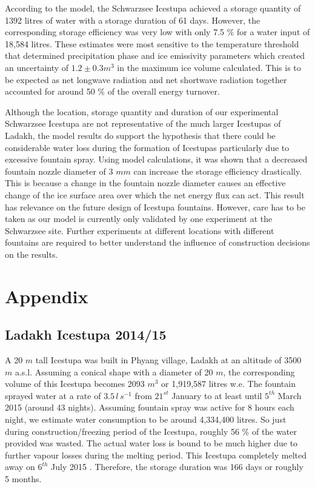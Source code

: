 \documentclass[utf8]{frontiersSCNS} %
\begin{document}
According to the model, the Schwarzsee Icestupa achieved a storage quantity of 1392 litres of water with a storage
duration of 61 days. However, the corresponding storage efficiency was very low with only 7.5 \% for a water input of
18,584 litres. These estimates were most sensitive to the temperature threshold that determined precipitation phase
and ice emissivity parameters which created an uncertainty of $1.2 \pm 0.3 m^3$ in the maximum ice volume calculated.
This is to be expected as net longwave radiation and net shortwave radiation together accounted for around 50 \% of
the overall energy turnover.

Although the location, storage quantity and duration of our experimental Schwarzsee Icestupa are not representative of
the much larger Icestupas of Ladakh, the model results do support the hypothesis that there could be considerable
water loss during the formation of Icestupas particularly due to excessive fountain spray. Using model calculations,
it was shown that a decreased fountain nozzle diameter of 3 $mm$ can increase the storage efficiency drastically. This
is because a change in the fountain nozzle diameter causes an effective change of the ice surface area over which the
net energy flux can act. This result has relevance on the future design of Icestupa fountains. However, care has to be
taken as our model is currently only validated by one experiment at the Schwarzsee site. Further experiments at
different locations with different fountains are required to better understand the influence of construction decisions
on the results. 



\section{Appendix}

\subsection{Ladakh Icestupa 2014/15} \label{section:ladakhloss} A 20 $m$ tall Icestupa \citep{iceheight} was built in
Phyang village, Ladakh at an altitude of 3500 $m$ a.s.l. Assuming a conical shape with a diameter of 20 $m$, the
corresponding volume of this Icestupa becomes 2093 $m^3$ or 1,919,587 litres w.e. The fountain sprayed water at a rate
of $3.5\, l\,s^{-1}$ \citep{waterinput} from $21^{st}$ January \citep{waterstart} to at least until $5^{th}$ March
2015 \citep{waterend} (around 43 nights). Assuming fountain spray was active for 8 hours each night, we estimate water
consumption to be around 4,334,400 litres. So just during construction/freezing period of the Icestupa, roughly 56 \%
of the water provided was wasted. The actual water loss is bound to be much higher due to further vapour losses during
the melting period. This Icestupa completely melted away on $6^{th}$ July 2015 \citep{iceends}. Therefore, the storage
duration was 166 days or roughly 5 months. 
\end{document}
